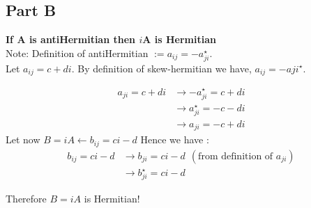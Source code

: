 \documentclass[10pt,a4paper]{article}
\begin{document}
	\subsection{Part B}
	\textbf{If A is antiHermitian then $i$A is Hermitian}\\
	Note: Definition of antiHermitian $:= a_{ij}=-a_{ji}^\star$.\\
	Let $a_{ij} = c+di$. By definition of skew-hermitian we have, $a_{ij}=-a{ji}^\star$.
	
	\begin{equation}
		\nonumber
		\begin{split}
			a_{ji}=c+di&\rightarrow -a_{ji}^\star = c+di\\
			&\rightarrow a_{ji}^\star = -c-di\\
			&\rightarrow a_{ji} = -c+di
		\end{split}
	\end{equation}
	Let now $B=iA \leftarrow b_{ij} = ci-d$
	Hence we have :
	\begin{equation}
		\begin{split}
			b_{ij} = ci-d & \rightarrow b_{ji} = ci-d \ \ (\text{from definition of } a_{ji})\\
			& \rightarrow b_{ji}^\star = ci-d
		\end{split}	
	\end{equation}
	
	Therefore $B=iA$ is Hermitian!
	
\end{document}
